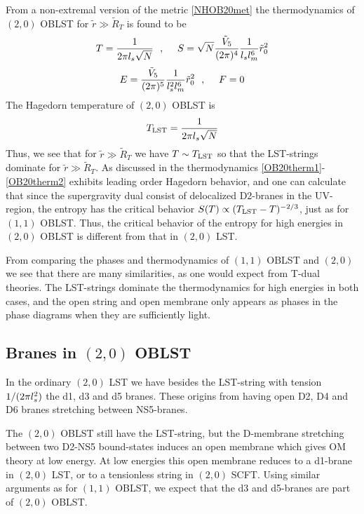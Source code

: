 \documentclass[a4paper,twoside,titlepage,12pt]{article}
\begin{document}
From a non-extremal version of the metric \eqref{NHOB20met} 
the thermodynamics of $(2,0)$ OBLST for $\tilde{r} \gg \tilde{R}_T$ is
found to be
%
\begin{equation}
\label{OB20therm1}
T = \frac{1}{2\pi l_s \sqrt{N}}
\ \ ,\ \ \ \ 
S = \sqrt{N} \frac{\tilde{V}_5 }{(2\pi)^4} \frac{1}{l_s l_m^6} \tilde{r}_0^2
\end{equation}
\begin{equation}
\label{OB20therm2}
E = \frac{\tilde{V}_5 }{(2\pi)^5} \frac{1}{l_s^2 l_m^6} \tilde{r}_0^2
\ \ ,\ \ \ \ 
F = 0
\end{equation}
%
The Hagedorn temperature of $(2,0)$ OBLST is
%
\begin{equation}
T_{\rm LST} = \frac{1}{2\pi l_s \sqrt{N}}
\end{equation}
%
Thus, we see that for $\tilde{r} \gg \tilde{R}_T$ we have $T \sim T_{\rm LST}$
so that the LST-strings dominate for $\tilde{r} \gg \tilde{R}_T$.
As discussed in \cite{Maldacena:1996ya,Maldacena:1997cg,Harmark:2000hw} 
the thermodynamics 
\eqref{OB20therm1}-\eqref{OB20therm2} exhibits leading order Hagedorn
behavior, and one can calculate \cite{Correia:2000} 
that since the supergravity dual
consist of delocalized D2-branes in the UV-region, the 
entropy has the critical behavior $S(T) \propto (T_{\rm LST}-T)^{-2/3}$,
just as for $(1,1)$ OBLST. Thus, the critical behavior
of the entropy for high energies
in $(2,0)$ OBLST is different from that in $(2,0)$ LST.

From comparing the phases and thermodynamics of $(1,1)$ OBLST and
$(2,0)$ we see that there are many similarities, as one would expect
from T-dual theories. 
The LST-strings dominate the thermodynamics for high energies
in both cases, and the open string and open membrane only appears
as phases in the phase diagrams when they are sufficiently light. 


\subsection{Branes in $(2,0)$ OBLST}

In the ordinary $(2,0)$ LST we have besides the LST-string with
tension $1/(2\pi l_s^2)$ the d1, d3 and d5 branes\cite{Losev:1997hx}.
These origins from having open D2, D4 and D6 branes
stretching between NS5-branes.

The $(2,0)$ OBLST still have the LST-string, but the
D-membrane stretching between two D2-NS5 bound-states induces
an open membrane which gives OM theory at low energy. 
At low energies this open membrane reduces to a d1-brane
in $(2,0)$ LST, or to a tensionless string in $(2,0)$ SCFT.
Using similar arguments as for $(1,1)$ OBLST, we
expect that the d3 and d5-branes are part of $(2,0)$ OBLST.
\end{document}
